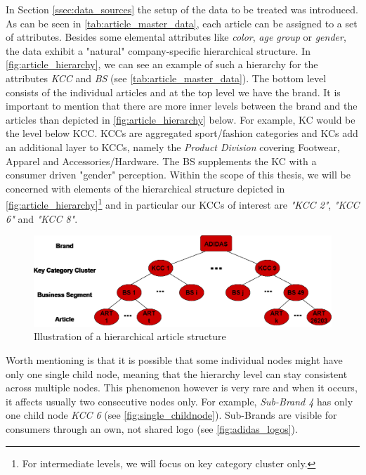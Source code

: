 
In Section \ref{ssec:data_sources} the setup of the data to be treated was introduced. As can be seen in \autoref{tab:article_master_data}, each article can be assigned to a set of attributes. Besides some elemental attributes like \textit{color}, \textit{age group} or \textit{gender}, the data exhibit a "natural" company-specific hierarchical structure. In \autoref{fig:article_hierarchy}, we can see an example of such a hierarchy for the attributes \textit{\ac{KCC}} and \textit{\ac{BS}} (see \autoref{tab:article_master_data}). The bottom level consists of the individual articles and at the top level we have the brand. It is important to mention that there are more inner levels between the brand and the articles than depicted in \autoref{fig:article_hierarchy} below. For example, \ac{KC} would be the level below \ac{KCC}. \acp{KCC} are aggregated sport/fashion categories and \acp{KC} add an additional layer to \acp{KCC}, namely the \textit{Product Division} covering Footwear, Apparel and Accessories/Hardware. The \ac{BS} supplements the \ac{KC} with a consumer driven "gender" perception.
Within the scope of this thesis, we will be concerned with elements of the hierarchical structure depicted in \autoref{fig:article_hierarchy}\footnote{For intermediate levels, we will focus on key category cluster only.} and in particular our \acp{KCC} of interest are \textit{"KCC 2"}, \textit{"KCC 6"} and \textit{"KCC 8"}.
\\

\begin{figure}[H]
\centering
  \includegraphics[width=0.95\linewidth]{figures/article_tree_KCC_BS.eps}
  \caption{Illustration of a hierarchical article structure}
  \label{fig:article_hierarchy}
\end{figure}

Worth mentioning is that it is possible that some individual nodes might have only one single child node, meaning that the hierarchy level can stay consistent across multiple nodes. This phenomenon however is very rare and when it occurs, it affects usually two consecutive nodes only. For example, \textit{Sub-Brand 4} has only one child node \textit{KCC 6} (see \autoref{fig:single_childnode}). Sub-Brands are visible for consumers through an own, not shared logo (see \autoref{fig:adidas_logos}).
\\

